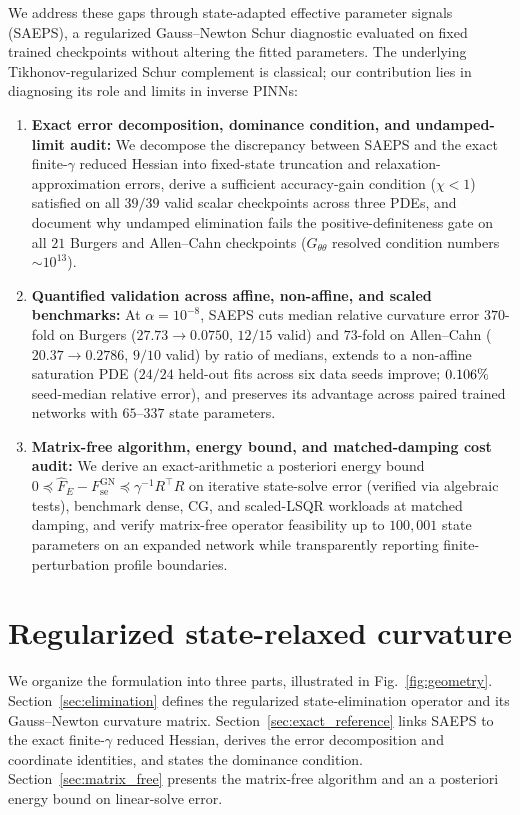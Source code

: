 \documentclass[preprint,11pt]{elsarticle}
\newcommand{\Fse}{F_{\mathrm{se}}^{\mathrm{GN}}}
\begin{document}
We address these gaps through state-adapted effective parameter signals (SAEPS), a regularized Gauss--Newton Schur diagnostic evaluated on fixed trained checkpoints without altering the fitted parameters.
The underlying Tikhonov-regularized Schur complement is classical; our contribution lies in diagnosing its role and limits in inverse PINNs:
\begin{enumerate}
\item \textbf{Exact error decomposition, dominance condition, and undamped-limit audit:} We decompose the discrepancy between SAEPS and the exact finite-$\gamma$ reduced Hessian into fixed-state truncation and relaxation-approximation errors, derive a sufficient accuracy-gain condition ($\chi<1$) satisfied on all $39/39$ valid scalar checkpoints across three PDEs, and document why undamped elimination fails the positive-definiteness gate on all $21$ Burgers and Allen--Cahn checkpoints ($G_{\theta\theta}$ resolved condition numbers $\sim 10^{13}$).
\item \textbf{Quantified validation across affine, non-affine, and scaled benchmarks:} At $\alpha=10^{-8}$, SAEPS cuts median relative curvature error $370$-fold on Burgers ($27.73\to0.0750$, $12/15$ valid) and $73$-fold on Allen--Cahn ($20.37\to0.2786$, $9/10$ valid) by ratio of medians, extends to a non-affine saturation PDE ($24/24$ held-out fits across six data seeds improve; $\num{0.106}\%$ seed-median relative error), and preserves its advantage across paired trained networks with $65$--$337$ state parameters.
\item \textbf{Matrix-free algorithm, energy bound, and matched-damping cost audit:} We derive an exact-arithmetic a posteriori energy bound $0\preceq\widehat F_E-\Fse\preceq\gamma^{-1}R^\top R$ on iterative state-solve error (verified via algebraic tests), benchmark dense, CG, and scaled-LSQR workloads at matched damping, and verify matrix-free operator feasibility up to $100{,}001$ state parameters on an expanded network while transparently reporting finite-perturbation profile boundaries.
\end{enumerate}

\section{Regularized state-relaxed curvature}
\label{sec:method}

We organize the formulation into three parts, illustrated in Fig.~\ref{fig:geometry}.
Section~\ref{sec:elimination} defines the regularized state-elimination operator and its Gauss--Newton curvature matrix.
Section~\ref{sec:exact_reference} links SAEPS to the exact finite-$\gamma$ reduced Hessian, derives the error decomposition and coordinate identities, and states the dominance condition.
Section~\ref{sec:matrix_free} presents the matrix-free algorithm and an a posteriori energy bound on linear-solve error.
\end{document}
